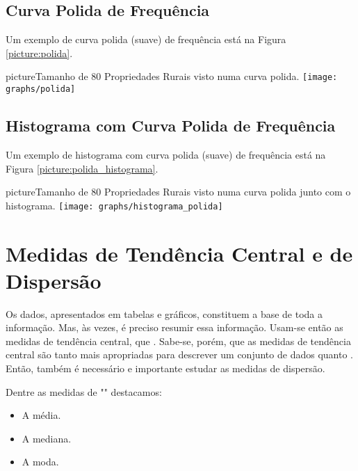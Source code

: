 \documentclass[11pt,fleqn]{book}
\numberwithin{mpicture}{chapter}
\numberwithin{mtable}{chapter}
\numberwithin{mframe}{chapter}
\begin{document}
\subsection{Curva Polida de Frequência}

Um exemplo de curva polida (suave) de frequência está na Figura \ref{picture:polida}.

\begin{pageWidthArea}
	\begin{pageWidthAreaPicture}{picture}{Tamanho de 80 Propriedades Rurais visto numa curva polida.}
		\label{picture:polida}
		\centering
		\texttt{[image: graphs/polida]}
	\end{pageWidthAreaPicture}
\end{pageWidthArea}

\newpage
\subsection{Histograma com Curva Polida de Frequência}

Um exemplo de histograma com curva polida (suave) de frequência está na Figura \ref{picture:polida_histograma}.

\begin{pageWidthArea}
	\begin{pageWidthAreaPicture}{picture}{Tamanho de 80 Propriedades Rurais visto numa curva polida junto com o histograma.}
		\label{picture:polida_histograma}
		\centering
		\texttt{[image: graphs/histograma\_polida]}
	\end{pageWidthAreaPicture}
\end{pageWidthArea}

\section{Medidas de Tendência Central e de Dispersão}

Os dados, apresentados em tabelas e gráficos, constituem a base de toda a informação. Mas, às vezes, é preciso resumir essa informação. Usam-se então as medidas de tendência central, que . Sabe-se, porém, que as medidas de tendência central são tanto mais apropriadas para descrever um conjunto de dados quanto . Então, também é necessário e importante estudar as medidas de dispersão.

Dentre as medidas de "" destacamos:
\begin{itemize}
	\item A média.
	\item A mediana.
	\item A moda.
\end{itemize}
\end{document}
